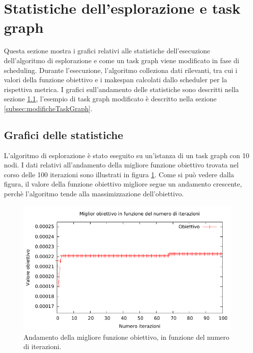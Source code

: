 \section{Statistiche dell'esplorazione e task graph}
\label{sec:statisticheEsplorazione}
Questa sezione mostra i grafici relativi alle statistiche dell'esecuzione dell'algoritmo
di esplorazione e come un task graph viene modificato
in fase di scheduling. Durante l'esecuzione, l'algoritmo colleziona dati rilevanti, tra cui i valori della
funzione obiettivo e i makespan calcolati dallo scheduler per la rispettiva metrica. I grafici sull'andamento
delle statistiche sono descritti nella sezione \ref{subsec:graficiStatistiche},
l'esempio di task graph modificato \`e descritto nella sezione \ref{subsec:modificheTaskGraph}.

\subsection{Grafici delle statistiche}
\label{subsec:graficiStatistiche}
L'algoritmo di esplorazione \`e stato eseguito su un'istanza di un task graph
con 10 nodi. I dati relativi all'andamento della migliore funzione obiettivo trovata
nel corso delle 100 iterazioni sono illustrati in figura \ref{fig:andamentoMiglioreObiettivo}.
Come si pu\`o vedere dalla figura, il valore della funzione obiettivo migliore segue un andamento crescente,
perch\`e l'algoritmo tende alla massimizzazione dell'obiettivo.

\begin{figure}[tb]
 \begin{center}
  \includegraphics[width=\textwidth]{./capitoli/figure/cap6/bestObjective.pdf}
  \caption{Andamento della migliore funzione obiettivo, in funzione del numero
  di iterazioni.}
  \label{fig:andamentoMiglioreObiettivo}
 \end{center}
\end{figure}

